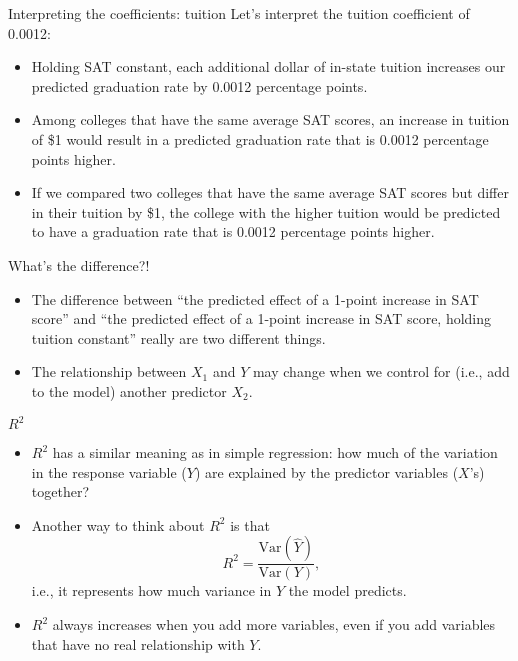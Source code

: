 \documentclass{beamer}\usepackage[]{graphicx}\usepackage[]{color}
\begin{document}
\begin{darkframes}
    \begin{frame}{Interpreting the coefficients: tuition}
      Let's interpret the tuition coefficient of 0.0012:
      \begin{itemize}[<+->]
        \item \alert{Holding SAT constant}, each additional dollar of in-state tuition increases our predicted graduation rate by 0.0012 percentage points.
        \item \alert{Among colleges that have the same average SAT scores}, an increase in tuition of \$1 would result in a predicted graduation rate that is 0.0012 percentage points higher.
        \item \alert{If we compared two colleges that have the same average SAT scores but differ in their tuition by \$1}, the college with the higher tuition would be predicted to have a graduation rate that is 0.0012 percentage points higher.
      \end{itemize}
    \end{frame}

    \begin{frame}{What's the difference?!}
      \begin{itemize}[<+->]
        \item The difference between ``the predicted effect of a 1-point increase in SAT score'' and ``the predicted effect of a 1-point increase in SAT score, holding tuition constant'' really are \alert{two different things}.
        \item The relationship between $X_1$ and $Y$ may change when we \alert{control for} (i.e., add to the model) another predictor $X_2$.
      \end{itemize}
    \end{frame}

    \begin{frame}{$R^2$}
      \begin{itemize}[<+->]
        \item $R^2$ has a similar meaning as in simple regression: how much of the variation in the response variable ($Y$) are explained by the predictor variables ($X$'s) together?
        \item Another way to think about $R^2$ is that \[ R^2 = \frac{\text{Var}(\hat Y)}{\text{Var}(Y)}, \] i.e., it represents how much variance in $Y$ the model predicts.
        \item $R^2$ always increases when you add more variables, \alert{even if you add variables that have no real relationship with $Y$}.
      \end{itemize}
    \end{frame}


\end{darkframes}
\end{document}
